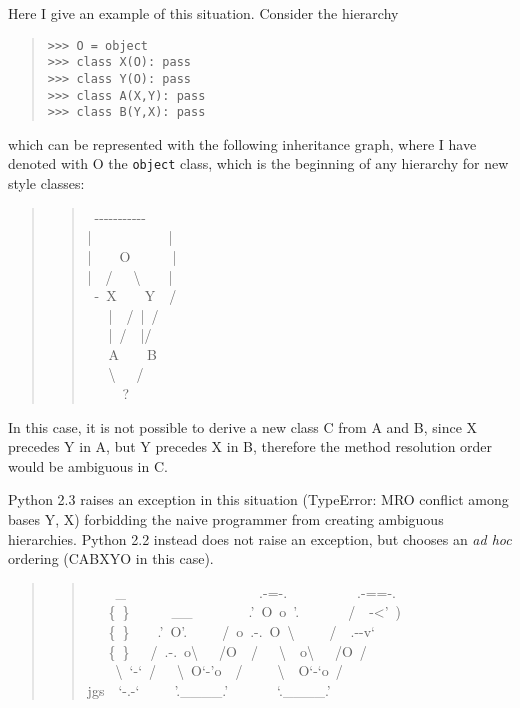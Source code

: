 \documentclass[10pt,a4paper,english]{article}
\begin{document}
Here I give an example of this situation. Consider the hierarchy
\begin{quote}
\begin{verbatim}>>> O = object
>>> class X(O): pass
>>> class Y(O): pass
>>> class A(X,Y): pass
>>> class B(Y,X): pass\end{verbatim}
\end{quote}

which can be represented with the following inheritance graph, where I
have denoted with O the \texttt{object} class, which is the beginning of any
hierarchy for new style classes:
\begin{quote}
\begin{quote}{\ttfamily \raggedright \noindent
~-{}-{}-{}-{}-{}-{}-{}-{}-{}-{}-~\\
|~~~~~~~~~~~|~\\
|~~~~O~~~~~~|~\\
|~~/~~~{\textbackslash}~~~~|~\\
~-~X~~~~Y~~/~\\
~~~|~~/~|~/~\\
~~~|~/~~|/~\\
~~~A~~~~B~\\
~~~{\textbackslash}~~~/~\\
~~~~~?
}\end{quote}
\end{quote}

In this case, it is not possible to derive a new class C from A and B,
since X precedes Y in A, but Y precedes X in B, therefore the method
resolution order would be ambiguous in C.

Python 2.3 raises an exception in this situation (TypeError:  MRO
conflict among bases Y, X) forbidding the naive programmer from creating
ambiguous hierarchies.  Python 2.2 instead does not raise an exception,
but chooses an \emph{ad hoc} ordering (CABXYO in this case).


\hspace*{\fill}\hrulefill\hspace*{\fill}

\begin{quote}
\begin{quote}{\ttfamily \raggedright \noindent
~~~~{\_}~~~~~~~~~~~~~~~~~~~.-=-.~~~~~~~~~~.-==-.~\\
~~~{\{}~{\}}~~~~~~{\_}{\_}~~~~~~~~.'~O~o~'.~~~~~~~/~~-<'~)~\\
~~~{\{}~{\}}~~~~.'~O'.~~~~~/~o~.-.~O~{\textbackslash}~~~~~/~~.-{}-v`~\\
~~~{\{}~{\}}~~~/~.-.~o{\textbackslash}~~~/O~~/~~~{\textbackslash}~~o{\textbackslash}~~~/O~/~\\
~~~~{\textbackslash}~`-`~/~~~{\textbackslash}~O`-'o~~/~~~~~{\textbackslash}~~O`-`o~/~\\
jgs~~`-.-`~~~~~'.{\_}{\_}{\_}{\_}.'~~~~~~~`.{\_}{\_}{\_}{\_}.'
}\end{quote}
\end{quote}
\end{document}
